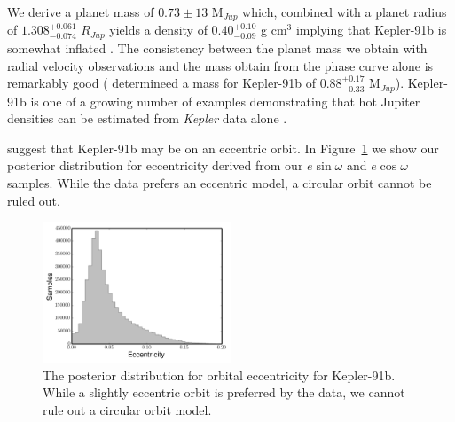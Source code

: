 \documentclass[apjl]{emulateapj}
\begin{document}
We derive a planet mass of $0.73\pm 13$ M$_{Jup}$ which, combined with a planet radius of $1.308^{+0.061}_{-0.074}$ $R_{Jup}$ yields a density of $0.40^{+0.10}_{-0.09}$ g cm$^{3}$ implying that Kepler-91b is somewhat inflated \citep{baraffe10}. The consistency between the planet mass we obtain with radial velocity observations and the mass \citet{lillo14} obtain from the phase curve alone is remarkably good (\citeauthor{lillo14} determineed a mass for Kepler-91b of $0.88^{+0.17}_{-0.33}$ M$_{Jup}$). Kepler-91b is one of a growing number of examples demonstrating that hot Jupiter densities can be estimated from \emph{Kepler} data alone \citep[e.g.][]{barclay12,quintana13,esteves13}.

\citet{lillo14} suggest that Kepler-91b may be on an eccentric orbit. In Figure~\ref{fig:ecc} we show our posterior distribution for eccentricity derived from our $e\sin{\omega}$ and $e\cos{\omega}$ samples. While the data prefers an eccentric model, a circular orbit cannot be ruled out.

\begin{figure}
\includegraphics[width=0.50\textwidth]{ecc_hist.png}
\caption{The posterior distribution for orbital eccentricity for Kepler-91b. While a slightly eccentric orbit is preferred by the data, we cannot rule out a circular orbit model.}
\label{fig:ecc}
\end{figure}
\end{document}

